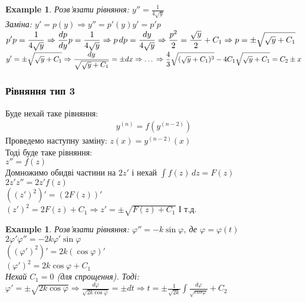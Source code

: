 \documentclass[a4paper, 10pt]{article}
\theoremstyle{theoremdd}
\theoremstyle{theoremdd}
\theoremstyle{theoremdd}
\theoremstyle{theoremdd}
\newtheorem{example}[theorem]{Example}
\theoremstyle{theoremdd}
\theoremstyle{theoremdd}
\theoremstyle{theoremdd}
\theoremstyle{theoremdd}
\begin{document}
	\begin{example}
 Розв'язати рівняння: $\displaystyle y'' = \frac{1}{4\sqrt{y}}$\\
	Заміна: $y'=p(y) \Rightarrow y''=p'(y)y'=p'p$\\
	$\displaystyle p'p = \frac{1}{4\sqrt{y}} \Rightarrow \frac{dp}{dy} p = \frac{1}{4\sqrt{y}} \Rightarrow p\,dp = \frac{dy}{4\sqrt{y}} \Rightarrow \frac{p^2}{2} = \frac{\sqrt{y}}{2} + C_1 \Rightarrow \\ p = \pm \sqrt{\sqrt{y}+C_1}$\\
	$\displaystyle y' = \pm \sqrt{\sqrt{y}+C_1} \Rightarrow \frac{dy}{\sqrt{\sqrt{y}+C_1}} = \pm dx \Rightarrow \dots \\ \Rightarrow \frac{4}{3}\sqrt{(\sqrt{y}+C_1)^3} - 4C_1\sqrt{\sqrt{y}+C_1} = C_2 \pm x$
	\end{example}

	
	\subsubsection{Рівняння тип 3}
	Буде нехай таке рівняння:
	\begin{align*}
	y^{(n)} = f(y^{(n-2)})
	\end{align*}
	Проведемо наступну заміну: $z(x) = y^{(n-2)}(x)$\\
	Тоді буде таке рівняння:\\
	$z'' = f(z)$\\
	Домножимо обидві частини на $2z'$ і нехай $\displaystyle \int f(z)\,dz = F(z)$\\
	$2z'z'' = 2z'f(z)$\\
	$((z')^2)' = (2F(z))'$\\
	$(z')^2 = 2F(z) + C_1 \Rightarrow z' = \displaystyle \pm \sqrt{F(z)+C_1}$ І т.д.
	
	\begin{example}
 Розв'язати рівняння: $\varphi'' = -k \sin \varphi$, де $\varphi = \varphi(t)$\\
	$2 \varphi' \varphi'' = -2k \varphi' \sin \varphi$\\
	$((\varphi')^2)' = 2k(\cos \varphi)'$\\
	$(\varphi')^2 = 2k\cos \varphi + C_1$\\
	Нехай $C_1 = 0$ (для спрощення). Тоді:\\
	$\varphi' = \pm \sqrt{2k\cos \varphi} \Rightarrow \displaystyle \frac{d\varphi}{\sqrt{2k \cos \varphi}} = \pm dt \Rightarrow t = \pm \frac{1}{\sqrt{2k}} \int \frac{d\varphi}{\sqrt{cos\varphi}} + C_2$
	\end{example}
	\newpage
	
\end{document}
